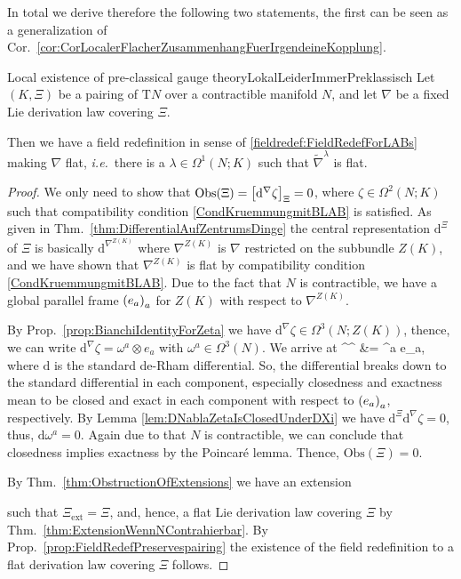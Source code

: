 In total we derive therefore the following two statements, the first can be seen as a generalization of Cor.~\ref{cor:CorLocalerFlacherZusammenhangFuerIrgendeineKopplung}.

\begin{theorems}{Local existence of pre-classical gauge theory}{LokalLeiderImmerPreklassisch}
Let $(K, \Xi)$ be a pairing of $\mathrm{T}N$ over a contractible manifold $N$, and let $\nabla$ be a fixed Lie derivation law covering $\Xi$.

Then we have a field redefinition in sense of \ref{fieldredef:FieldRedefForLABs} making $\nabla$ flat, \textit{i.e.}~there is a $\lambda\in\Omega^1(N;K)$ such that $\widetilde{\nabla}^\lambda$ is flat.
\end{theorems}

\begin{proof}
\leavevmode\newline
We only need to show that $\mathrm{Obs}(\Xi) = \mleft[ \mathrm{d}^\nabla \zeta \mright]_\Xi = 0$, where $\zeta \in \Omega^2(N; K)$ such that compatibility condition \eqref{CondKruemmungmitBLAB} is satisfied. As given in Thm.~\ref{thm:DifferentialAufZentrumsDinge} the central representation $\mathrm{d}^\Xi$ of $\Xi$ is basically $\mathrm{d}^{\nabla^{Z(K)}}$ where $\nabla^{Z(K)}$ is $\nabla$ restricted on the subbundle $Z(K)$, and we have shown that $\nabla^{Z(K)}$ is flat by compatibility condition \eqref{CondKruemmungmitBLAB}. Due to the fact that $N$ is contractible, we have a global parallel frame $\mleft( e_a \mright)_a$ for $Z(K)$ with respect to $\nabla^{Z(K)}$.

By Prop.~\ref{prop:BianchiIdentityForZeta} we have $\mathrm{d}^\nabla \zeta \in \Omega^3(N; Z(K))$, thence, we can write $\mathrm{d}^\nabla \zeta = \omega^a \otimes e_a$ with $\omega^a \in \Omega^3(N)$. We arrive at
\bas
{}^\Xi {}^\nabla \zeta
&=
\omega^a \otimes e_a,
\eas
where $\mathrm{d}$ is the standard de-Rham differential. So, the differential breaks down to the standard differential in each component, especially closedness and exactness mean to be closed and exact in each component with respect to $\mleft( e_a \mright)_a$, respectively. By Lemma \ref{lem:DNablaZetaIsClosedUnderDXi} we have $\mathrm{d}^\Xi \mathrm{d}^\nabla \zeta=0$, thus, $\mathrm{d}\omega^a = 0$. Again due to that $N$ is contractible, we can conclude that closedness implies exactness by the Poincaré lemma. Thence, $\mathrm{Obs}(\Xi) = 0$.

By Thm.~\ref{thm:ObstructionOfExtensions} we have an extension
\begin{center}
\end{center}
such that $\Xi_{\mathrm{ext}} = \Xi$, and, hence, a flat Lie derivation law covering $\Xi$ by Thm.~\ref{thm:ExtensionWennNContrahierbar}. By Prop.~\ref{prop:FieldRedefPreservespairing} the existence of the field redefinition to a flat derivation law covering $\Xi$ follows.
\end{proof}

